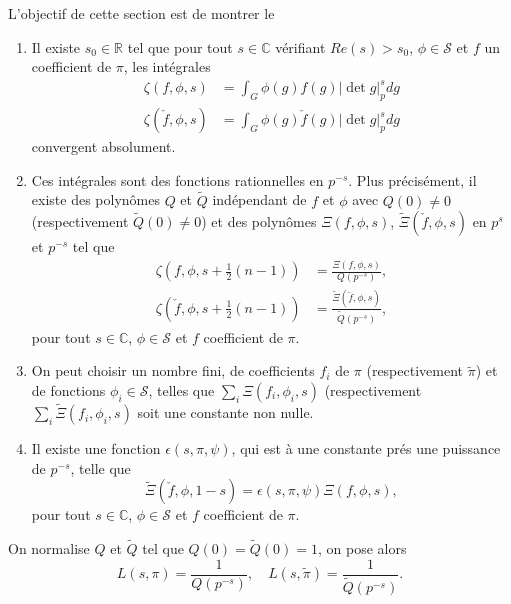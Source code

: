 L'objectif de cette section est de montrer le
\begin{theoreme}
\begin{enumerate}
\item Il existe $s_0 \in \mathbb{R}$ tel que pour tout $s \in \mathbb{C}$ vérifiant $Re (s) > s_0$, $\phi \in \mathcal{S}$ et $f$ un coefficient de $\pi$, les intégrales
\begin{align}
\zeta(f, \phi, s) &= \int_G \phi(g)f(g)|\det g|_p^s dg \\
\zeta(\check{f}, \phi, s) &= \int_G \phi(g)\check{f}(g)|\det g|_p^s dg
\end{align}
convergent absolument.
\item Ces intégrales sont des fonctions rationnelles en $p^{-s}$. Plus précisément, il existe des polynômes $Q$ et $\tilde{Q}$ indépendant de $f$ et $\phi$ avec $Q(0)\neq 0$ (respectivement $\tilde{Q}(0)\neq 0$) et des polynômes $\Xi(f, \phi, s)$, $\tilde{\Xi}(\check{f}, \phi, s)$ en $p^{s}$ et $p^{-s}$ tel que
\begin{align}
\zeta(f, \phi, s+\frac{1}{2}(n-1)) &= \frac{\Xi(f, \phi, s)}{Q(p^{-s})}, \\
\zeta(\check{f}, \phi, s+\frac{1}{2}(n-1)) &= \frac{\tilde{\Xi}(\check{f}, \phi, s)}{\tilde{Q}(p^{-s})},
\end{align}
pour tout $s \in \mathbb{C}$, $\phi \in \mathcal{S}$ et $f$ coefficient de $\pi$.
\item On peut choisir un nombre fini, de coefficients $f_i$ de $\pi$ (respectivement $\tilde{\pi}$) et de fonctions $\phi_i \in \mathcal{S}$, telles que $\sum_i \Xi(f_i, \phi_i, s)$ (respectivement $\sum_i \tilde{\Xi}(f_i, \phi_i, s)$ soit une constante non nulle.
\item Il existe une fonction $\epsilon(s, \pi, \psi)$, qui est à une constante prés une puissance de $p^{-s}$, telle que
\begin{equation}
\label{epsilon}
\tilde{\Xi}(\check{f}, \hat{\phi}, 1-s) = \epsilon(s, \pi, \psi)\Xi(f, \phi, s),
\end{equation}
pour tout $s\in \mathbb{C}$, $\phi \in \mathcal{S}$ et $f$ coefficient de $\pi$.
\end{enumerate}
\end{theoreme}

On normalise $Q$ et $\tilde{Q}$ tel que $Q(0)=\tilde{Q}(0)=1$, on pose alors
\begin{equation}
L(s, \pi) = \frac{1}{Q(p^{-s})}, \quad L(s, \tilde{\pi}) = \frac{1}{\tilde{Q}(p^{-s})}.
\end{equation}

